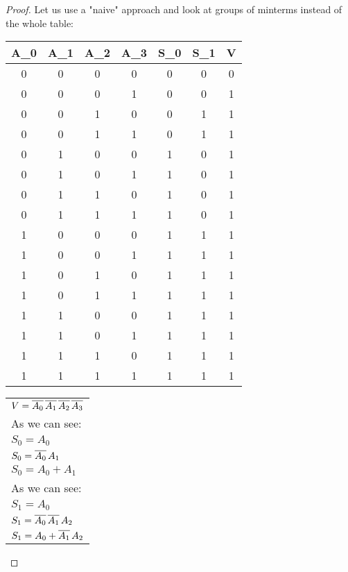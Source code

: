 \begin{proof}
	Let us use a "naive" approach and look at groups of minterms instead of the whole table:
	\begin{center}
		\begin{tabular}{ |C|C|C|C|C|C|C| } 
			\hline
			A_0 & A_1 & A_2 & A_3 & S_0 & S_1 & V \\
			 & 0 & 0 & 0 & 0 & 0 & 0 \\
			0 & 0 & 0 & 1 & 0 & 0 & 1 \\
			0 & 0 & 1 & 0 & 0 & 1 & 1 \\
			0 & 0 & 1 & 1 & 0 & 1 & 1 \\
			0 & 1 & 0 & 0 & 1 & 0 & 1 \\
			0 & 1 & 0 & 1 & 1 & 0 & 1 \\
			0 & 1 & 1 & 0 & 1 & 0 & 1 \\
			0 & 1 & 1 & 1 & 1 & 0 & 1 \\
			1 & 0 & 0 & 0 & 1 & 1 & 1 \\
			1 & 0 & 0 & 1 & 1 & 1 & 1 \\
			1 & 0 & 1 & 0 & 1 & 1 & 1 \\
			1 & 0 & 1 & 1 & 1 & 1 & 1 \\
			1 & 1 & 0 & 0 & 1 & 1 & 1 \\
			1 & 1 & 0 & 1 & 1 & 1 & 1 \\
			1 & 1 & 1 & 0 & 1 & 1 & 1 \\
			1 & 1 & 1 & 1 & 1 & 1 & 1 \\
			\hline
		\end{tabular}
		\hspace{0.5cm}
		\begin{tabular}{ l } 
			$V = \bnot{A_0} \, \bnot{A_1} \, \bnot{A_2} \, \bnot{A_3}$ \\
			\hspace{0.5cm} As we can see: \\
			\hspace{0.5cm} \tabitem $S_0 = A_0$ \\
			\hspace{0.5cm} \tabitem $S_0 = \bnot{A_0} \, A_1$ \\
			$S_0 = A_0 + A_1$ \\
			\hspace{0.5cm} As we can see: \\
			\hspace{0.5cm} \tabitem $S_1 = A_0$ \\
			\hspace{0.5cm} \tabitem $S_1 = \bnot{A_0} \, \bnot{A_1} \, A_2$ \\
			$S_1 = A_0 + \bnot{A_1} \, A_2$ \\
		\end{tabular}
	\end{center}


\end{proof}
